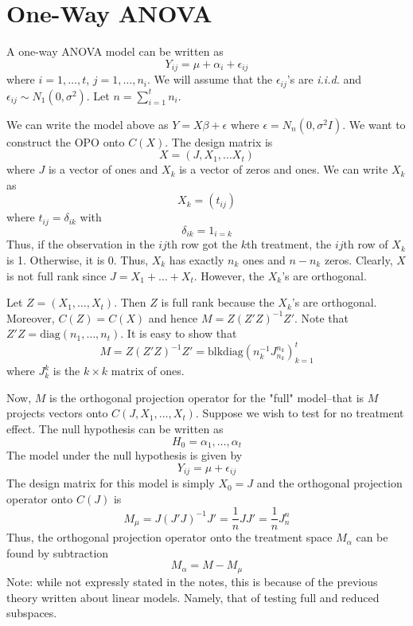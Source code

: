 \documentclass[12pt]{article}
\newcommand{\diag}{\text{diag}}
\newcommand{\blkdiag}{\text{blkdiag}}
\numberwithin{equation}{section}
\begin{document}
\section{One-Way ANOVA}
A one-way ANOVA model can be written as
\begin{equation*}
  Y_{ij} = \mu + \alpha_i + \epsilon_{ij}
\end{equation*}
where $i = 1, \ldots, t$, $j = 1, \ldots, n_i$. We will assume that the $\epsilon_{ij}$'s are \textit{i.i.d.} and $\epsilon_{ij} \sim N_1(0, \sigma^2)$. Let $n = \sum_{i = 1}^t n_i$.

We can write the model above as $Y = X\beta + \epsilon$ where $\epsilon = N_n(0, \sigma^2 I)$. We want to construct the OPO onto $C(X)$. The design matrix is
\begin{equation*}
  X = (J, X_1, \ldots X_t)
\end{equation*}
where $J$ is a vector of ones and $X_k$ is a vector of zeros and ones. We can write $X_k$ as
\begin{equation*}
  X_k = (t_{ij})
\end{equation*}
where $t_{ij} = \delta_{ik}$ with
\begin{equation*}
  \delta_{ik} = 1_{i = k}
\end{equation*}
Thus, if the observation in the $ij$th row got the $k$th treatment, the $ij$th row of $X_k$ is 1. Otherwise, it is 0. Thus, $X_k$ has exactly $n_k$ ones and $n - n_k$ zeros. Clearly, $X$ is not full rank since $J = X_1 + \ldots + X_t$. However, the $X_k$'s are orthogonal.

Let $Z = (X_1, \ldots, X_t)$. Then $Z$ is full rank because the $X_k$'s are orthogonal. Moreover, $C(Z) = C(X)$ and hence 
$M = Z(Z'Z)^{-1}Z'$. Note that 
$Z'Z = \diag(n_1, \ldots, n_t)$. It is easy to show that 
\begin{equation*}
  M = Z(Z'Z)^{-1} Z' = \blkdiag(n_k^{-1} J_{n_k}^{n_k})_{k = 1}^t
\end{equation*}
where $J_{k}^k$ is the $k \times k$ matrix of ones.

Now, $M$ is the orthogonal projection operator for the "full" model--that is $M$ projects vectors onto $C(J, X_1, \ldots, X_t)$. Suppose we wish to test for no treatment effect. The null hypothesis can be written as
\begin{equation*}
  H_0 = \alpha_1, \ldots, \alpha_t
\end{equation*}
%
The model under the null hypothesis is given by
\begin{equation*}
  Y_{ij} = \mu + \epsilon_{ij}
\end{equation*}
% 
The design matrix for this model is simply $X_0 = J$ and the orthogonal projection operator onto $C(J)$ is
\begin{equation*}
  M_{\mu} = J(J'J)^{-1} J' = \frac{1}{n} JJ' = \frac{1}{n}J_n^n
\end{equation*}
Thus, the orthogonal projection operator onto the treatment space $M_\alpha$ can be found by subtraction
\begin{equation*}
  M_\alpha = M - M_\mu
\end{equation*}
Note: while not expressly stated in the notes, this is because of the previous theory written about linear models. Namely, that of testing full and reduced subspaces. 
\end{document}
